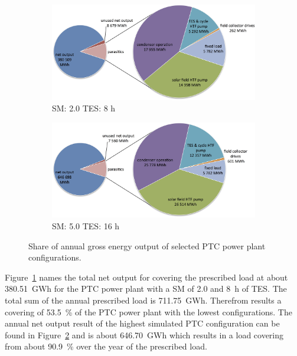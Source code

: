 \begin{figure}[!thbp]
        \centering   
        \begin{subfigure}[b]{0.65\textwidth}
                \centering
                \includegraphics[width=1\textwidth]{FIG/PTC_parasitics_low}
                \caption{SM: 2.0 TES: 8 h}\label{PTC_parasitics_low}
        \end{subfigure}
\par\medskip %
        \begin{subfigure}[b]{0.65\textwidth}
                \centering
                \includegraphics[width=1\textwidth]{FIG/PTC_parasitics_high}
                \caption{SM: 5.0 TES: 16 h}\label{PTC_parasitics_high}
        \end{subfigure}
        \caption[Share of annual gross energy output of selected PTC power plant configurations.]{Share of annual gross energy output of selected PTC power plant configurations.}\label{PTC_parasitics}
\end{figure}
Figure~\ref{PTC_parasitics_low} names the total net output for covering the prescribed load at about 380.51~GWh for the PTC power plant with a SM of 2.0 and 8~h of TES. The total sum of the annual prescribed load is 711.75~GWh. Therefrom results a covering of 53.5~\% of the PTC power plant with the lowest configurations. The annual net output result of the highest simulated PTC configuration can be found in Figure~\ref{PTC_parasitics_high} and is about 646.70~GWh which results in a load covering from about 90.9~\% over the year of the prescribed load. 

